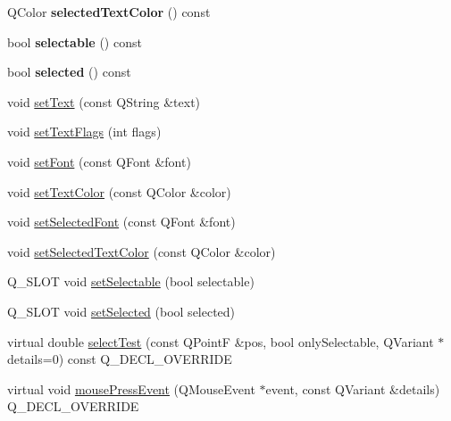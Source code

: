 \begin{DoxyCompactItemize}
\item 
Q\+Color {\bfseries selected\+Text\+Color} () const \hypertarget{class_q_c_p_text_element_a419b72712eda4242cd169926440ab6a9}{}\label{class_q_c_p_text_element_a419b72712eda4242cd169926440ab6a9}

\item 
bool {\bfseries selectable} () const \hypertarget{class_q_c_p_text_element_ad6f36a709b85638a0e2c005efa4b1049}{}\label{class_q_c_p_text_element_ad6f36a709b85638a0e2c005efa4b1049}

\item 
bool {\bfseries selected} () const \hypertarget{class_q_c_p_text_element_a81f68f4628a7e3c4bd22dbcce09740c5}{}\label{class_q_c_p_text_element_a81f68f4628a7e3c4bd22dbcce09740c5}

\item 
void \hyperlink{class_q_c_p_text_element_ac44b81e69e719b879eb2feecb33557e2}{set\+Text} (const Q\+String \&text)
\item 
void \hyperlink{class_q_c_p_text_element_ab908f437f552020888a3ad8cf8242605}{set\+Text\+Flags} (int flags)
\item 
void \hyperlink{class_q_c_p_text_element_a09b3241769528fa87cb4bf35c97defad}{set\+Font} (const Q\+Font \&font)
\item 
void \hyperlink{class_q_c_p_text_element_a4f3b8361c3ffb3f84346954929ce93ba}{set\+Text\+Color} (const Q\+Color \&color)
\item 
void \hyperlink{class_q_c_p_text_element_a0a2397a3c4ede519e16ab3e991904065}{set\+Selected\+Font} (const Q\+Font \&font)
\item 
void \hyperlink{class_q_c_p_text_element_abaec200cae70a0eade53583defc0476d}{set\+Selected\+Text\+Color} (const Q\+Color \&color)
\item 
Q\+\_\+\+S\+L\+OT void \hyperlink{class_q_c_p_text_element_a3c5f9b1897a036b16495ed3fb8371c55}{set\+Selectable} (bool selectable)
\item 
Q\+\_\+\+S\+L\+OT void \hyperlink{class_q_c_p_text_element_aba5521f9fb22a5f3d2f09ab37d4a1751}{set\+Selected} (bool selected)
\item 
virtual double \hyperlink{class_q_c_p_text_element_a1e721bc2994a127ef5a8f0a514a5dbac}{select\+Test} (const Q\+PointF \&pos, bool only\+Selectable, Q\+Variant $\ast$details=0) const Q\+\_\+\+D\+E\+C\+L\+\_\+\+O\+V\+E\+R\+R\+I\+DE
\item 
virtual void \hyperlink{class_q_c_p_text_element_ad7b2c98355e3d2f912574b74fcee0574}{mouse\+Press\+Event} (Q\+Mouse\+Event $\ast$event, const Q\+Variant \&details) Q\+\_\+\+D\+E\+C\+L\+\_\+\+O\+V\+E\+R\+R\+I\+DE

\end{DoxyCompactItemize}
